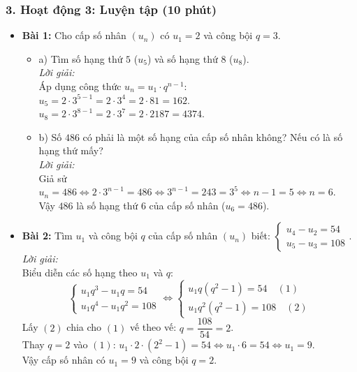 \documentclass[12pt, a4paper]{article}
\begin{document}
\subsubsection*{3. Hoạt động 3: Luyện tập (10 phút)}
\begin{itemize}
    \item \textbf{Bài 1:} Cho cấp số nhân $(u_n)$ có $u_1 = 2$ và công bội $q = 3$.
    \begin{itemize}
        \item a) Tìm số hạng thứ $5$ ($u_5$) và số hạng thứ $8$ ($u_8$).\\
        \textit{Lời giải:}\\
        Áp dụng công thức $u_n = u_1 \cdot q^{n-1}$:\\
        $u_5 = 2 \cdot 3^{5-1} = 2 \cdot 3^4 = 2 \cdot 81 = 162$.\\
        $u_8 = 2 \cdot 3^{8-1} = 2 \cdot 3^7 = 2 \cdot 2187 = 4374$.
        \item b) Số $486$ có phải là một số hạng của cấp số nhân không? Nếu có là số hạng thứ mấy?\\
        \textit{Lời giải:}\\
        Giả sử $u_n = 486 \iff 2 \cdot 3^{n-1} = 486 \iff 3^{n-1} = 243 = 3^5 \iff n - 1 = 5 \iff n = 6$.\\
        Vậy $486$ là số hạng thứ $6$ của cấp số nhân ($u_6 = 486$).
    \end{itemize}
    \item \textbf{Bài 2:} Tìm $u_1$ và công bội $q$ của cấp số nhân $(u_n)$ biết: $\begin{cases} u_4 - u_2 = 54 \\ u_5 - u_3 = 108 \end{cases}$.\\
    \textit{Lời giải:}\\
    Biểu diễn các số hạng theo $u_1$ và $q$:
    $$\begin{cases} u_1 q^3 - u_1 q = 54 \\ u_1 q^4 - u_1 q^2 = 108 \end{cases} \iff \begin{cases} u_1 q(q^2 - 1) = 54 \quad (1) \\ u_1 q^2(q^2 - 1) = 108 \quad (2) \end{cases}$$
    Lấy $(2)$ chia cho $(1)$ vế theo vế: $q = \dfrac{108}{54} = 2$.\\
    Thay $q = 2$ vào $(1)$: $u_1 \cdot 2 \cdot (2^2 - 1) = 54 \iff u_1 \cdot 6 = 54 \iff u_1 = 9$.\\
    Vậy cấp số nhân có $u_1 = 9$ và công bội $q = 2$.
\end{itemize}
\end{document}

